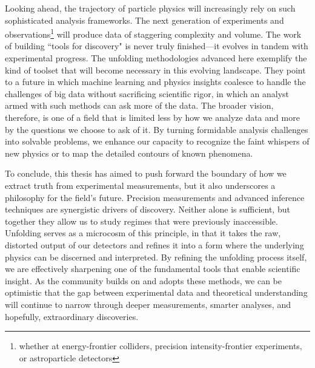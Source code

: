     Looking ahead, the trajectory of particle physics will increasingly rely on such sophisticated analysis frameworks.
    The next generation of experiments and observations\footnote{whether at energy-frontier colliders, precision intensity-frontier experiments, or astroparticle detectors} will produce data of staggering complexity and volume.
    The work of building ``tools for discovery" is never truly finished---it evolves in tandem with experimental progress.
    The unfolding methodologies advanced here exemplify the kind of toolset that will become necessary in this evolving landscape.
    They point to a future in which machine learning and physics insights coalesce to handle the challenges of big data without sacrificing scientific rigor, in which an analyst armed with such methods can ask more of the data.
    The broader vision, therefore, is one of a field that is limited less by how we analyze data and more by the questions we choose to ask of it.
    By turning formidable analysis challenges into solvable problems, we enhance our capacity to recognize the faint whispers of new physics or to map the detailed contours of known phenomena.
                
    To conclude, this thesis has aimed to push forward the boundary of how we extract truth from experimental measurements, but it also underscores a philosophy for the field's future.
    Precision measurements and advanced inference techniques are synergistic drivers of discovery.
    Neither alone is sufficient, but together they allow us to study regimes that were previously inaccessible.
    Unfolding serves as a microcosm of this principle, in that it takes the raw, distorted output of our detectors and refines it into a form where the underlying physics can be discerned and interpreted.
    By refining the unfolding process itself, we are effectively sharpening one of the fundamental tools that enable scientific insight.
    As the community builds on and adopts these methods, we can be optimistic that the gap between experimental data and theoretical understanding will continue to narrow through deeper measurements, smarter analyses, and hopefully, extraordinary discoveries.